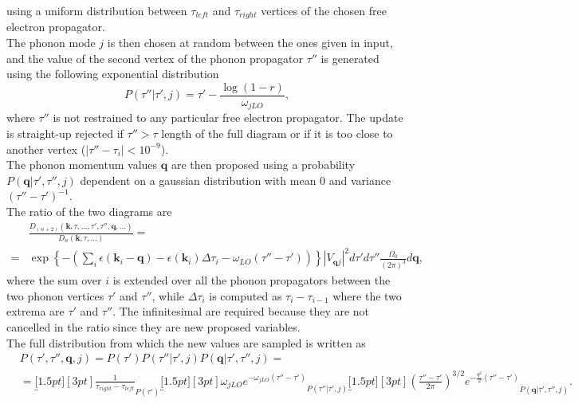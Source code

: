 using a uniform distribution between $\tau_{left}$ and $\tau_{right}$ vertices of the chosen free electron propagator.\\
The phonon mode $j$ is then chosen at random between the ones given in input, and the value of the second vertex of the phonon propagator $\tau''$ is generated using the
following exponential distribution
\begin{equation}
    P(\tau''|\tau',j)=\tau'-\frac{\log(1-r)}{\omega_{jLO}},
\end{equation}
where $\tau''$ is not restrained to any particular free electron propagator. The update is straight-up rejected if $\tau''>\tau$ length of the 
full diagram or if it is too close to another vertex ($|\tau''-\tau_i|<10^{-9}$).\\
The phonon momentum values $\mathbf{q}$ are then proposed using a probability $P(\mathbf{q}|\tau',\tau'',j)$ dependent on a gaussian distribution with 
mean $0$ and variance $(\tau''-\tau')^{-1}$.\\
The ratio of the two diagrams are
\begin{equation}
\begin{split}
    &\frac{D_{(n+2)}(\mathbf{k},\tau,...,\tau',\tau'',\mathbf{q},...)}{D_{n}(\mathbf{k},\tau,...)}=\\
    =&\exp{\left\{-\left(\sum_i\epsilon(\mathbf{k}_i-\mathbf{q})-\epsilon(\mathbf{k}_i)\Delta\tau_i-\omega_{LO}(\tau''-\tau')\right)\right\}}|V_{\mathbf{q}j}|^2d\tau'd\tau''\frac{\Omega_0}{(2\pi)^3}d\mathbf{q},
\end{split}
\end{equation}
where the sum over $i$ is extended over all the phonon propagators between the two phonon vertices $\tau'$ and $\tau''$, while $\Delta\tau_i$ is computed as $\tau_i-\tau_{i-1}$ where the two 
extrema are $\tau'$ and $\tau''$. The infinitesimal are required because they are not cancelled in the ratio since they are new proposed variables.\\
The full distribution from which the new values are sampled is written as
\begin{equation}
\begin{split}
    &P(\tau',\tau'',\mathbf{q},j)=P(\tau')P(\tau''|\tau',j)P(\mathbf{q}|\tau',\tau'',j)=\\
    &=\underbracket[1.5pt][3pt]{\frac{1}{\tau_{right}-\tau_{left}}}_{P(\tau')}\underbracket[1.5pt][3pt]{\omega_{jLO}e^{-\omega_{jLO}(\tau''-\tau')}}_{P(\tau''|\tau',j)}
    \underbracket[1.5pt][3pt]{\left(\frac{\tau''-\tau'}{2\pi}\right)^{3/2}e^{-\frac{q^2}{2}(\tau''-\tau')}}_{P(\mathbf{q}|\tau',\tau'',j)}.
\end{split}
\end{equation}
